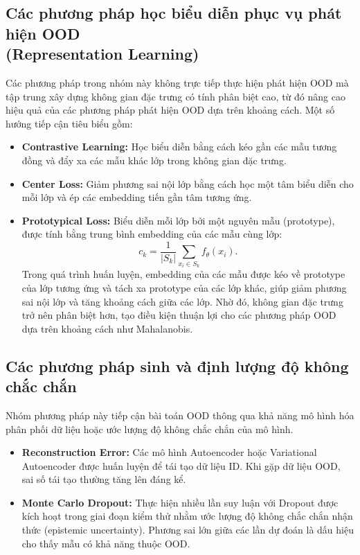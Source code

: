 \subsection{Các phương pháp học biểu diễn phục vụ phát hiện OOD\\(Representation Learning)}
Các phương pháp trong nhóm này không trực tiếp thực hiện phát hiện OOD mà tập trung xây dựng không gian đặc trưng có tính phân biệt cao, từ đó nâng cao hiệu quả của các phương pháp phát hiện OOD dựa trên khoảng cách. Một số hướng tiếp cận tiêu biểu gồm: 
\begin{itemize} 
  \item \textbf{Contrastive Learning:} Học biểu diễn bằng cách kéo gần các mẫu tương đồng và đẩy xa các mẫu khác lớp trong không gian đặc trưng. 
  \item \textbf{Center Loss:} Giảm phương sai nội lớp bằng cách học một tâm biểu diễn cho mỗi lớp và ép các embedding tiến gần tâm tương ứng. 
  \item \textbf{Prototypical Loss:} Biểu diễn mỗi lớp bởi một nguyên mẫu (prototype), được tính bằng trung bình embedding của các mẫu cùng lớp: 
  \[ c_k=\frac{1}{|S_k|}\sum_{x_i\in S_k}f_\theta(x_i). \] 
  Trong quá trình huấn luyện, embedding của các mẫu được kéo về prototype của lớp tương ứng và tách xa prototype của các lớp khác, giúp giảm phương sai nội lớp và tăng khoảng cách giữa các lớp. Nhờ đó, không gian đặc trưng trở nên phân biệt hơn, tạo điều kiện thuận lợi cho các phương pháp OOD dựa trên khoảng cách như Mahalanobis. 
\end{itemize} 

\subsection{Các phương pháp sinh và định lượng độ không chắc chắn} Nhóm phương pháp này tiếp cận bài toán OOD thông qua khả năng mô hình hóa phân phối dữ liệu hoặc ước lượng độ không chắc chắn của mô hình. 
\begin{itemize} 
  \item \textbf{Reconstruction Error:} Các mô hình Autoencoder hoặc Variational Autoencoder được huấn luyện để tái tạo dữ liệu ID. Khi gặp dữ liệu OOD, sai số tái tạo thường tăng lên đáng kể. 
  \item \textbf{Monte Carlo Dropout:} Thực hiện nhiều lần suy luận với Dropout được kích hoạt trong giai đoạn kiểm thử nhằm ước lượng độ không chắc chắn nhận thức (epistemic uncertainty). Phương sai lớn giữa các lần dự đoán là dấu hiệu cho thấy mẫu có khả năng thuộc OOD. 
\end{itemize} 

